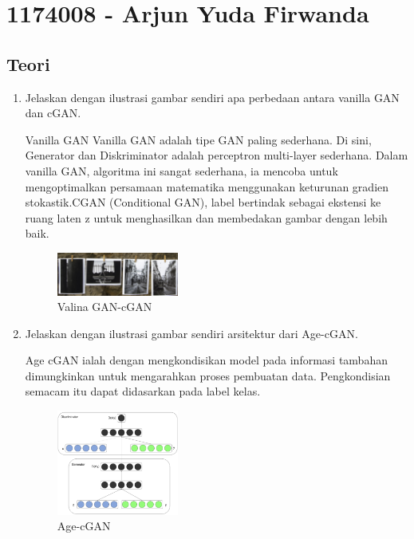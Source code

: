 \section{1174008 - Arjun Yuda Firwanda}

\subsection{Teori}
\begin{enumerate}

        \item Jelaskan dengan ilustrasi gambar sendiri apa perbedaan antara vanilla GAN dan cGAN.

Vanilla GAN Vanilla GAN adalah tipe GAN paling sederhana. Di sini, Generator dan Diskriminator adalah perceptron multi-layer sederhana. Dalam vanilla GAN, algoritma ini sangat sederhana, ia mencoba untuk mengoptimalkan persamaan matematika menggunakan keturunan gradien stokastik.CGAN (Conditional GAN), label bertindak sebagai ekstensi ke ruang laten z untuk menghasilkan dan membedakan gambar dengan lebih baik. 

	\begin{figure}[H]
            	\includegraphics[width=4cm]{figures/1174008/9/teori1.PNG}
           	\centering
           	\caption{Valina GAN-cGAN}
        	\end{figure}

        \item Jelaskan dengan ilustrasi gambar sendiri arsitektur dari Age-cGAN.

Age cGAN ialah dengan mengkondisikan model pada informasi tambahan dimungkinkan untuk mengarahkan proses pembuatan data. Pengkondisian semacam itu dapat didasarkan pada label kelas.

	\begin{figure}[H]
		\includegraphics[width=4cm]{figures/1174008/9/teori2.PNG}
            	\centering
           	\caption{Age-cGAN}
       	 \end{figure}


\end{enumerate}
